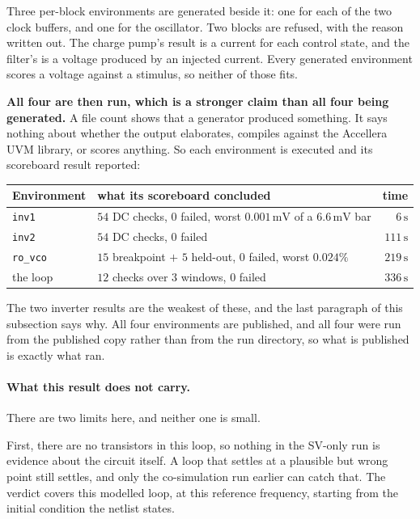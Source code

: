 \documentclass[11pt,a4paper]{article}
\newcommand{\unit}[1]{\,\textrm{#1}}
\begin{document}
Three per-block environments are generated beside it: one for each of
the two clock buffers, and one for the oscillator. Two blocks are
refused, with the reason written out. The charge pump's result is a
current for each control state, and the filter's is a voltage produced
by an injected current. Every generated environment scores a voltage
against a stimulus, so neither of those fits.

\textbf{All four are then run, which is a stronger claim than all four
being generated.} A file count shows that a generator produced
something. It says nothing about whether the output elaborates,
compiles against the Accellera UVM library, or scores anything. So
each environment is executed and its scoreboard result reported:

\begin{center}
\begin{tabular}{@{}llr@{}}
\toprule
\textbf{Environment} & \textbf{what its scoreboard concluded} & \textbf{time} \\
\midrule
\texttt{inv1}   & $54$ DC checks, $0$ failed, worst $0.001\unit{mV}$ of a $6.6\unit{mV}$ bar & $6\unit{s}$ \\
\texttt{inv2}   & $54$ DC checks, $0$ failed & $111\unit{s}$ \\
\texttt{ro\_vco} & $15$ breakpoint $+$ $5$ held-out, $0$ failed, worst $0.024\%$ & $219\unit{s}$ \\
the loop        & $12$ checks over $3$ windows, $0$ failed & $336\unit{s}$ \\
\bottomrule
\end{tabular}
\end{center}

\noindent The two inverter results are the weakest of these, and the
last paragraph of this subsection says why. All four environments are
published, and all four were run from the published copy rather than
from the run directory, so what is published is exactly what ran.

\paragraph{What this result does not carry.} There are two limits
here, and neither one is small.

First, there are no transistors in this loop, so nothing in the
SV-only run is evidence about the circuit itself. A loop that settles
at a plausible but wrong point still settles, and only the
co-simulation run earlier can catch that. The verdict covers this
modelled loop, at this reference frequency, starting from the initial
condition the netlist states.
\end{document}
